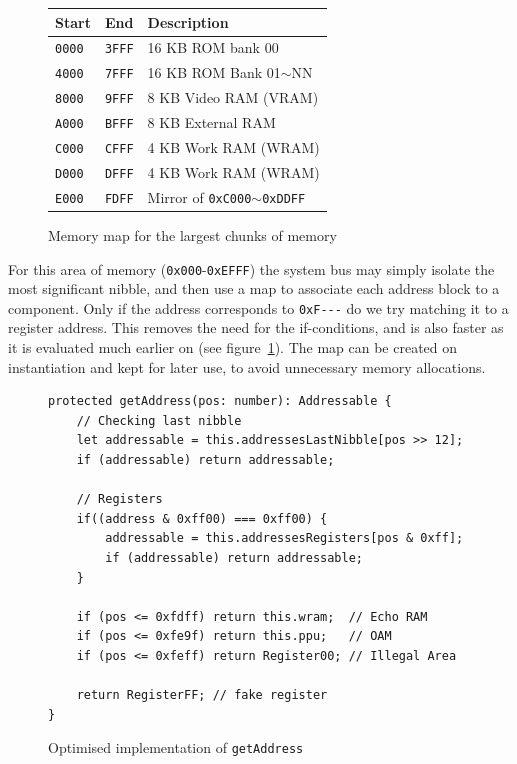 \documentclass[11pt]{informatics-report}
\begin{document}
\begin{figure}[h]
    \centering
    \begin{tabular}{|l|l|l|}
    \hline
    \textbf{Start} & \textbf{End} & \textbf{Description} \\ \hline
    \texttt{0000} & \texttt{3FFF} & 16 KB ROM bank 00 \\ \hline
    \texttt{4000} & \texttt{7FFF} & 16 KB ROM Bank 01$\sim$NN \\ \hline
    \texttt{8000} & \texttt{9FFF} & 8 KB Video RAM (VRAM) \\ \hline
    \texttt{A000} & \texttt{BFFF} & 8 KB External RAM \\ \hline
    \texttt{C000} & \texttt{CFFF} & 4 KB Work RAM (WRAM) \\ \hline
    \texttt{D000} & \texttt{DFFF} & 4 KB Work RAM (WRAM) \\ \hline
    \texttt{E000} & \texttt{FDFF} & Mirror of \texttt{0xC000}$\sim$\texttt{0xDDFF} \\ \hline
    \end{tabular}
    \caption{Memory map for the largest chunks of memory \cite{memorymap}}
\end{figure}

For this area of memory (\texttt{0x000}-\texttt{0xEFFF}) the system bus may simply isolate the most significant nibble, and then use a map to associate each address block to a component. Only if the address corresponds to \texttt{0xF-{}-{}-} do we try matching it to a register address. This removes the need for the if-conditions, and is also faster as it is evaluated much earlier on (see figure~\ref{fig:getaddress-after}). The map can be created on instantiation and kept for later use, to avoid unnecessary memory allocations.

\begin{figure}[h]
    \begin{verbatim}
protected getAddress(pos: number): Addressable {
    // Checking last nibble
    let addressable = this.addressesLastNibble[pos >> 12];
    if (addressable) return addressable;

    // Registers
    if((address & 0xff00) === 0xff00) {
        addressable = this.addressesRegisters[pos & 0xff];
        if (addressable) return addressable;
    }

    if (pos <= 0xfdff) return this.wram;  // Echo RAM
    if (pos <= 0xfe9f) return this.ppu;   // OAM
    if (pos <= 0xfeff) return Register00; // Illegal Area

    return RegisterFF; // fake register
}
    \end{verbatim}
    \caption{Optimised implementation of \texttt{getAddress}}
    \label{fig:getaddress-after}
\end{figure}
\end{document}
